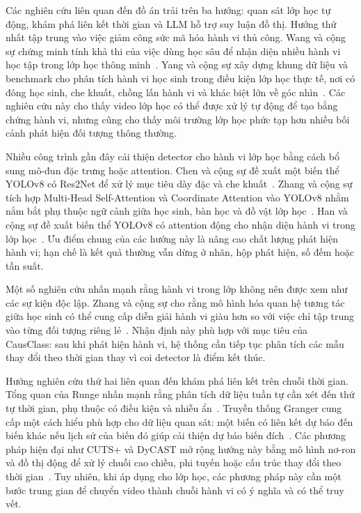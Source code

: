Các nghiên cứu liên quan đến đồ án trải trên ba hướng: quan sát lớp học tự động, khám phá liên kết thời gian và LLM hỗ trợ suy luận đồ thị. Hướng thứ nhất tập trung vào việc giảm công sức mã hóa hành vi thủ công. Wang và cộng sự chứng minh tính khả thi của việc dùng học sâu để nhận diện nhiều hành vi học tập trong lớp học thông minh \,\cite{wang2023smartclassroom}. Yang và cộng sự xây dựng khung dữ liệu và benchmark cho phân tích hành vi học sinh trong điều kiện lớp học thực tế, nơi có đông học sinh, che khuất, chồng lấn hành vi và khác biệt lớn về góc nhìn \,\cite{yang2023yolov7bra}. Các nghiên cứu này cho thấy video lớp học có thể được xử lý tự động để tạo bằng chứng hành vi, nhưng cũng cho thấy môi trường lớp học phức tạp hơn nhiều bối cảnh phát hiện đối tượng thông thường.

Nhiều công trình gần đây cải thiện detector cho hành vi lớp học bằng cách bổ sung mô-đun đặc trưng hoặc attention. Chen và cộng sự đề xuất một biến thể YOLOv8 có Res2Net để xử lý mục tiêu dày đặc và che khuất \,\cite{chen2023improvedyolov8}. Zhang và cộng sự tích hợp Multi-Head Self-Attention và Coordinate Attention vào YOLOv8 nhằm nắm bắt phụ thuộc ngữ cảnh giữa học sinh, bàn học và đồ vật lớp học \,\cite{zhang2025yolov8attention}. Han và cộng sự đề xuất biến thể YOLOv8 có attention động cho nhận diện hành vi trong lớp học \,\cite{han2025wadyolov8}. Ưu điểm chung của các hướng này là nâng cao chất lượng phát hiện hành vi; hạn chế là kết quả thường vẫn dừng ở nhãn, hộp phát hiện, số đếm hoặc tần suất.

Một số nghiên cứu nhấn mạnh rằng hành vi trong lớp không nên được xem như các sự kiện độc lập. Zhang và cộng sự cho rằng mô hình hóa quan hệ tương tác giữa học sinh có thể cung cấp diễn giải hành vi giàu hơn so với việc chỉ tập trung vào từng đối tượng riêng lẻ \,\cite{zhang2024superresolution}. Nhận định này phù hợp với mục tiêu của CausClass: sau khi phát hiện hành vi, hệ thống cần tiếp tục phân tích các mẫu thay đổi theo thời gian thay vì coi detector là điểm kết thúc.

Hướng nghiên cứu thứ hai liên quan đến khám phá liên kết trên chuỗi thời gian. Tổng quan của Runge nhấn mạnh rằng phân tích dữ liệu tuần tự cần xét đến thứ tự thời gian, phụ thuộc có điều kiện và nhiễu ẩn \,\cite{runge2023causalreview}. Truyền thống Granger cung cấp một cách hiểu phù hợp cho dữ liệu quan sát: một biến có liên kết dự báo đến biến khác nếu lịch sử của biến đó giúp cải thiện dự báo biến đích \,\cite{granger1969causality}. Các phương pháp hiện đại như CUTS+ và DyCAST mở rộng hướng này bằng mô hình nơ-ron và đồ thị động để xử lý chuỗi cao chiều, phi tuyến hoặc cấu trúc thay đổi theo thời gian \,\cite{cheng2024cutsplus,cheng2025dycast}. Tuy nhiên, khi áp dụng cho lớp học, các phương pháp này cần một bước trung gian để chuyển video thành chuỗi hành vi có ý nghĩa và có thể truy vết.

